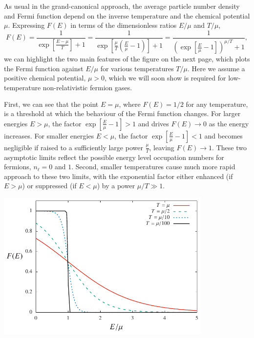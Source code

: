 As usual in the grand-canonical approach, the average particle number density and Fermi function depend on the inverse temperature \be and the chemical potential $\mu$.
Expressing $F(E)$ in terms of the dimensionless ratios $E / \mu$ and $T / \mu$,
\begin{equation*}
  F(E) = \frac{1}{\exp\left[\frac{E - \mu}{T}\right] + 1} = \frac{1}{\exp\left[\frac{\mu}{T}\left(\frac{E}{\mu} - 1\right)\right] + 1} = \frac{1}{\left(\exp\left[\frac{E}{\mu} - 1\right]\right)^{\mu / T} + 1},
\end{equation*}
we can highlight the two main features of the figure on the next page, which plots the Fermi function against $E / \mu$ for various temperatures $T / \mu$.
Here we assume a positive chemical potential, $\mu > 0$, which we will soon show is required for low-temperature non-relativistic fermion gases.

First, we can see that the point $E = \mu$, where $F(E) = 1 / 2$ for any temperature, is a threshold at which the behaviour of the Fermi function changes.
For larger energies $E > \mu$, the factor $\exp\left[\frac{E}{\mu} - 1\right] > 1$ and drives $F(E) \to 0$ as the energy increases.
For smaller energies $E < \mu$, the factor $\exp\left[\frac{E}{\mu} - 1\right] < 1$ and becomes negligible if raised to a sufficiently large power $\frac{\mu}{T}$, leaving $F(E) \to 1$.
These two asymptotic limits reflect the possible energy level occupation numbers for fermions, $n_{\ell} = 0$ and $1$.
Second, smaller temperatures cause much more rapid approach to these two limits, with the exponential factor either enhanced (if $E > \mu$) or suppressed (if $E < \mu$) by a power $\mu / T \gg 1$. \\[-24 pt]
\begin{center}\includegraphics[width=0.8\textwidth]{figs/unit08_dist.pdf}\end{center}

